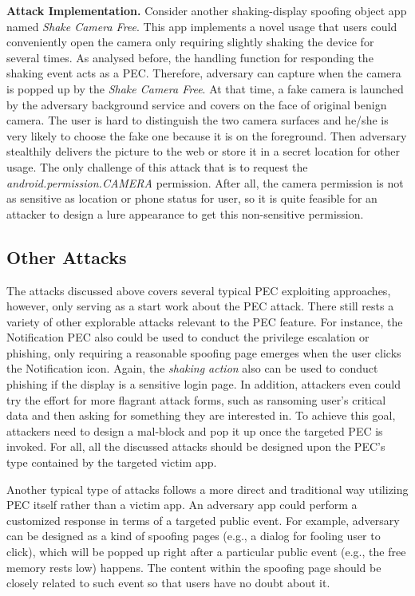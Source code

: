 \textbf{Attack Implementation.}
Consider another shaking-display spoofing object app named \textit{Shake Camera Free}. This app implements a novel usage that users could conveniently open the camera only requiring slightly shaking the device for several times. As analysed before, the handling function for responding the shaking event acts as a PEC. Therefore, adversary can capture when the camera is popped up by the \textit{Shake Camera Free}. At that time, a fake camera is launched by the adversary background service and covers on the face of original benign camera. The user is hard to distinguish the two camera surfaces and he/she is very likely to choose the fake one because it is on the foreground. Then adversary stealthily delivers the picture to the web or store it in a secret location for other usage. The only challenge of this attack that is to request the \textit{android.permission.CAMERA} permission. After all, the camera permission is not as sensitive as location or phone status for user, so it is quite feasible for an attacker to design a lure appearance to get this non-sensitive permission.



\subsection{Other Attacks}
The attacks discussed above covers several typical PEC exploiting approaches, however, only serving as a start work about the PEC attack. There still rests a variety of other explorable attacks relevant to the PEC feature. For instance, the Notification PEC also could be used to conduct the privilege escalation or phishing, only requiring a reasonable spoofing page emerges when the user clicks the Notification icon. Again, the \textit{shaking action} also can be used to conduct phishing if the display is a sensitive login page. In addition, attackers even could try the effort for more flagrant attack forms, such as ransoming user's critical data and then asking for something they are interested in. To achieve this goal, attackers need to design a mal-block and pop it up once the targeted PEC is invoked. For all, all the discussed attacks should be designed upon the PEC's type contained by the targeted victim app.

Another typical type of attacks follows a more direct and traditional way utilizing PEC itself rather than a victim app. An adversary app could perform a customized response in terms of a targeted public event. For example, adversary can be designed as a kind of spoofing pages (e.g., a dialog for fooling user to click), which will be popped up right after a particular public event (e.g., the free memory rests low) happens. The content within the spoofing page should be closely related to such event so that users have no doubt about it. 
